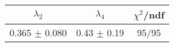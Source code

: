 \begin{tabular}{c|c||c}
$\lambda_{2}$ & $\lambda_4$ & $\chi^{2}$/ndf \\
\hline
0.365 $\pm$ 0.080 & 0.43 $\pm$ 0.19 & 95/95\\
\end{tabular}

